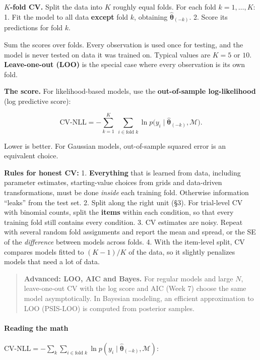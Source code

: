 \textbf{\(K\)-fold CV.} Split the data into \(K\) roughly equal folds.
For each fold \(k = 1, \dots, K\): 1. Fit the model to all data
\textbf{except} fold \(k\), obtaining
\(\hat{\boldsymbol\theta}_{(-k)}\). 2. Score its predictions for fold
\(k\).

Sum the scores over folds. Every observation is used once for testing,
and the model is never tested on data it was trained on. Typical values
are \(K = 5\) or \(10\). \textbf{Leave-one-out (LOO)} is the special
case where every observation is its own fold.

\textbf{The score.} For likelihood-based models, use the
\textbf{out-of-sample log-likelihood} (log predictive score):

\[
\mathrm{CV\text{-}NLL} = -\sum_{k=1}^{K}\ \sum_{i \in \text{fold } k} \ln p\big(y_i \mid \hat{\boldsymbol\theta}_{(-k)}, \mathcal{M}\big).
\]

Lower is better. For Gaussian models, out-of-sample squared error is an
equivalent choice.

\textbf{Rules for honest CV:} 1. \textbf{Everything} that is learned
from data, including parameter estimates, starting-value choices from
grids and data-driven transformations, must be done \emph{inside} each
training fold. Otherwise information ``leaks'' from the test set. 2.
Split along the right unit (§3). For trial-level CV with binomial
counts, split the \textbf{items} within each condition, so that every
training fold still contains every condition. 3. CV estimates are noisy.
Repeat with several random fold assignments and report the mean and
spread, or the SE of the \emph{difference} between models across folds.
4. With the item-level split, CV compares models fitted to \((K-1)/K\)
of the data, so it slightly penalizes models that need a lot of data.

\begin{quote}
\textbf{Advanced: LOO, AIC and Bayes.} For regular models and large
\(N\), leave-one-out CV with the log score and AIC (Week 7) choose the
same model asymptotically. In Bayesian modeling, an efficient
approximation to LOO (PSIS-LOO) is computed from posterior samples.
\end{quote}

\paragraph{Reading the math}

\(\mathrm{CV\text{-}NLL} = -\sum_{k}\sum_{i \in \text{fold } k} \ln p(y_i \mid \hat{\boldsymbol\theta}_{(-k)}, \mathcal{M})\):

